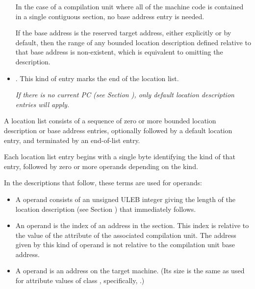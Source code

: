 \begin{itemize}
In the case of a compilation unit where all of the machine
code is contained in a single contiguous section, no base
address entry is needed.

\bb
If the base address is the reserved target address, either explicitly
or by default, then the range of any bounded location description
defined relative to that base address is non-existent, which is
equivalent to omitting the description.
\eb

\item  {}.
This kind of entry marks the end of the location list.

\textit{If there is no current PC (see Section
  ), only default location
  description entries will apply.}

\end{itemize}

A location list consists of a sequence of zero or more bounded
location description or base address entries, optionally followed
by a default location entry, and terminated by an end-of-list
entry.

Each location list entry begins with a single byte identifying
the kind of that entry, followed by zero or more operands depending
on the kind.   

In the descriptions that follow, these terms are used for operands:
   
\begin{itemize}
\item A  operand consists of
an unsigned ULEB integer giving the length of the location
description (see Section ) 
that immediately follows.

\item An  operand is the index of an address
in the \dotdebugaddr{} section. This index is relative to the
value of the \DWATaddrbase{} attribute of the associated
compilation unit. The address given by this kind
of operand is not relative to the compilation unit base address.
   
\item A  operand is an address on the target
machine. (Its size is the same as used for attribute values of
class \CLASSaddress, specifically, \DWFORMaddr.)

\end{itemize}
 
